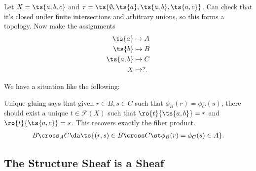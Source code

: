 \begin{example}

Let \(X = \ts{a, b, c}\) and
\(\tau = \ts{\emptyset, \ts{a}, \ts{a, b}, \ts{a, c}}\). Can check that
it's closed under finite intersections and arbitrary unions, so this
forms a topology. Now make the assignments
\begin{align*}
\ts{a}    & \mapsto A \\
\ts{b}    & \mapsto B \\
\ts{a, b} & \mapsto C \\
X         & \mapsto ?
.\end{align*}

We have a situation like the following:

\begin{center}
\end{center}

Unique gluing says that given \(r\in B, s\in C\) such that
\(\phi_B(r) = \phi_C(s)\), there should exist a unique
\(t\in \mathcal{F}(X)\) such that \(\ro{t}{\ts{a, b}} = r\) and
\(\ro{t}{\ts{a, c}} = s\). This recovers exactly the fiber product.
\begin{align*}  
B \cross_A C \da \ts{(r, s) \in B\cross C \st \phi_B(r) = \phi_C(s) \in A}
.\end{align*}

\end{example}

\hypertarget{the-structure-sheaf-is-a-sheaf}{%
\subsection{The Structure Sheaf is a
Sheaf}\label{the-structure-sheaf-is-a-sheaf}}


